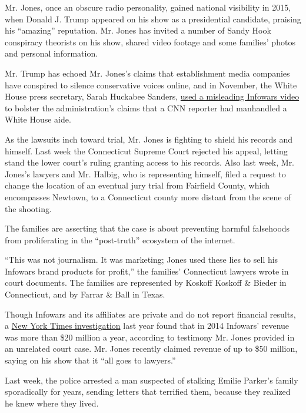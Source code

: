 Mr. Jones, once an obscure radio personality, gained national visibility
in 2015, when Donald J. Trump appeared on his show as a presidential
candidate, praising his ``amazing'' reputation. Mr. Jones has invited a
number of Sandy Hook conspiracy theorists on his show, shared video
footage and some families' photos and personal information.

Mr. Trump has echoed Mr. Jones's claims that establishment media
companies have conspired to silence conservative voices online, and in
November, the White House press secretary, Sarah Huckabee Sanders,
\href{https://www.nytimes3xbfgragh.onion/2018/11/08/business/media/infowars-white-house-jim-acosta-cnn.html}{used
a misleading Infowars video} to bolster the administration's claims that
a CNN reporter had manhandled a White House aide.

As the lawsuits inch toward trial, Mr. Jones is fighting to shield his
records and himself. Last week the Connecticut Supreme Court rejected
his appeal, letting stand the lower court's ruling granting access to
his records. Also last week, Mr. Jones's lawyers and Mr. Halbig, who is
representing himself, filed a request to change the location of an
eventual jury trial from Fairfield County, which encompasses Newtown, to
a Connecticut county more distant from the scene of the shooting.

The families are asserting that the case is about preventing harmful
falsehoods from proliferating in the ``post-truth'' ecosystem of the
internet.

``This was not journalism. It was marketing; Jones used these lies to
sell his Infowars brand products for profit,'' the families' Connecticut
lawyers wrote in court documents. The families are represented by
Koskoff Koskoff \& Bieder in Connecticut, and by Farrar \& Ball in
Texas.

Though Infowars and its affiliates are private and do not report
financial results, a
\href{https://www.nytimes3xbfgragh.onion/2018/09/07/us/politics/alex-jones-business-infowars-conspiracy.html?module=inline}{New
York Times investigation} last year found that in 2014 Infowars' revenue
was more than \$20 million a year, according to testimony Mr. Jones
provided in an unrelated court case. Mr. Jones recently claimed revenue
of up to \$50 million, saying on his show that it ``all goes to
lawyers.''

Last week, the police arrested a man suspected of stalking Emilie
Parker's family sporadically for years, sending letters that terrified
them, because they realized he knew where they lived.

